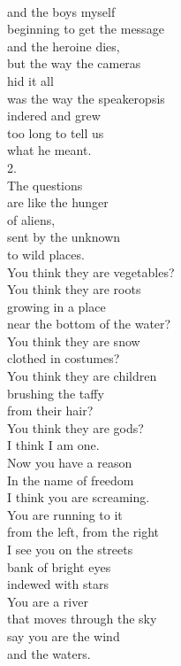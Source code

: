\documentclass[smalldemyvopaper,11pt,twoside,onecolumn,openright,extrafontsizes]{memoir}
\begin{document}
\\and the boys myself
\\beginning to get the message
\\and the heroine dies,
\\but the way the cameras
\\hid it all
\\was the way the speakeropsis
\\indered and grew
\\too long to tell us
\\what he meant.
\\2.
\\The questions
\\are like the hunger
\\of aliens,
\\sent by the unknown
\\to wild places.
\\You think they are vegetables?
\\You think they are roots
\\growing in a place
\\near the bottom of the water?
\\You think they are snow
\\clothed in costumes?
\\You think they are children
\\brushing the taffy
\\from their hair?
\\You think they are gods?
\\I think I am one.
\\Now you have a reason
\\In the name of freedom
\\I think you are screaming.
\\You are running to it
\\from the left, from the right
\\I see you on the streets
\\bank of bright eyes
\\indewed with stars
\\You are a river
\\that moves through the sky
\\say you are the wind
\\and the waters.
\end{document}
